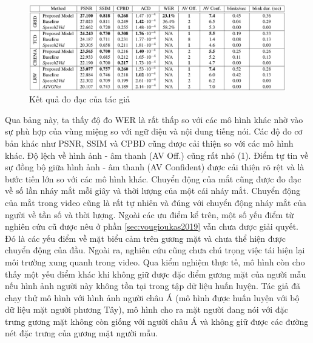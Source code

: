\begin{figure}[H]
    \centering
    \includegraphics[width=15cm]{./content/images/vou2020_result.png}
    \caption{Kết quả đo đạc của tác giả}
    \label{fig:vou2020_result}
\end{figure}

Qua bảng này, ta thấy độ đo WER là rất thấp so với các mô hình khác nhờ vào sự phù hợp của vùng miệng so với ngữ điệu và nội dung tiếng nói. Các độ đo cơ bản khác như PSNR, SSIM và CPBD cũng được cải thiện so với các mô hình khác. Độ lệch về hình ảnh - âm thanh (AV Off.) cũng rất nhỏ (1). Điểm tự tin về sự đồng bộ giữa hình ảnh - âm thanh (AV Confident) được cải thiện rõ rệt và là bước tiến lớn so với các mô hình khác. Chuyển động của mắt cũng được đo đạc về số lần nháy mắt mỗi giây và thời lượng của một cái nháy mắt. Chuyển động của mắt trong video cũng là rất tự nhiên và đúng với chuyển động nháy mắt của người về tần số và thời lượng.
Ngoài các ưu điểm kể trên, một số yếu điểm từ nghiên cứu cũ được nêu ở phần \ref{sec:vougioukas2019} vẫn chưa được giải quyết. Đó là các yếu điểm về mặt biểu cảm trên gương mặt và chưa thể hiện được chuyển động của đầu. Ngoài ra, nghiên cứu cũng chưa chú trọng việc tái hiện lại môi trường xung quanh trong video. Qua kiểm nghiệm thực tế, mô hình còn cho thấy một yếu điểm khác khi không giữ được đặc điểm gương mặt của người mẫu nếu hình ảnh người này không tồn tại trong tập dữ liệu huấn luyện. Tác giả đã chạy thử mô hình với hình ảnh người châu Á (mô hình được huấn luyện với bộ dữ liệu mặt người phương Tây), mô hình cho ra mặt người đang nói với đặc trưng gương mặt không còn giống với người châu Á và không giữ được các đường nét đặc trưng của gương mặt người mẫu.



